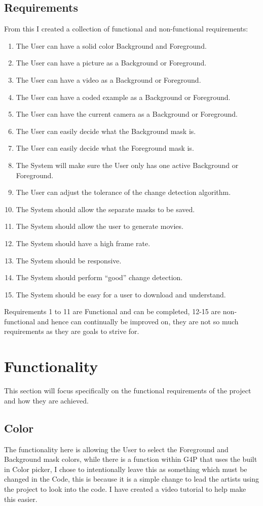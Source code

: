 \documentclass[a4paper]{report}
\begin{document}
\subsection{Requirements}
From this I created a collection of functional and non-functional requirements:

\begin{enumerate}
\item The User can have a solid color Background and Foreground.
\item The User can have a picture as a Background or Foreground.
\item The User can have a video as a Background or Foreground.
\item The User can have a coded example as a Background or Foreground.
\item The User can have the current camera as a Background or Foreground.
\item The User can easily decide what the Background mask is.
\item The User can easily decide what the Foreground mask is.
\item The System will make sure the User only has one active Background or Foreground.
\item The User can adjust the tolerance of the change detection algorithm.
\item The System should allow the separate masks to be saved.
\item The System should allow the user to generate movies.
\item The System should have a high frame rate.
\item The System should be responsive.
\item The System should perform “good” change detection.
\item The System should be easy for a user to download and understand.
\end{enumerate}

Requirements 1 to 11 are Functional and can be completed, 12-15 are non-functional and hence can continually be improved on, they are not so much requirements as they are goals to strive for.

\section{Functionality}
This section will focus specifically on the functional requirements of the project and how they are achieved.

\subsection{Color}
The functionality here is allowing the User to select the Foreground and Background mask colors, while there is a function within G4P\cite{G4P} that uses the built in Color picker, I chose to intentionally leave this as something which must be changed in the Code, this is because it is a simple change to lead the artists using the project to look into the code. I have created a video tutorial to help make this easier.
\end{document}
